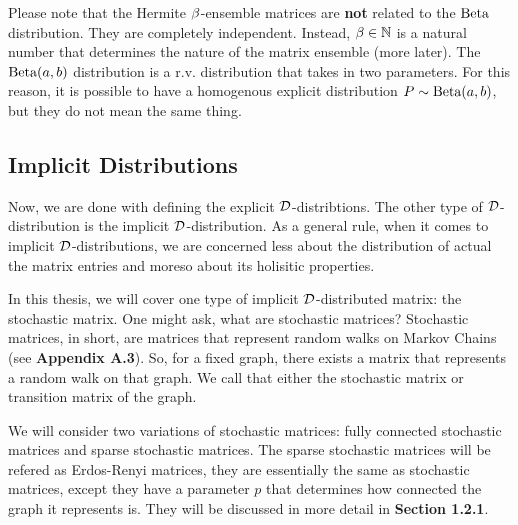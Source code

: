 \begin{warning}[$\b$-Notation]
Please note that the Hermite $\b$-ensemble matrices are \textbf{not} related to the $\text{Beta}$ distribution. They are completely independent.
Instead, $\beta \in \mathbb{N}$ is a natural number that determines the nature of the matrix ensemble (more later). The $\text{Beta}(a,b)$ distribution is a r.v. distribution that
takes in two parameters. For this reason, it is possible to have a homogenous explicit distribution $P \sim \text{Beta}(a,b)$, but they do not mean the same thing.
\end{warning}



\subsection{Implicit Distributions}

Now, we are done with defining the explicit $\mathcal{D}$-distribtions. The other type of $\mathcal{D}$-distribution is the implicit $\mathcal{D}$-distribution.
As a general rule, when it comes to implicit $\mathcal{D}$-distributions, we are concerned less about the distribution of actual the matrix entries and moreso about its holisitic properties.

In this thesis, we will cover one type of implicit $\mathcal{D}$-distributed matrix: the stochastic matrix. One might ask, what are stochastic matrices?
Stochastic matrices, in short, are matrices that represent random walks on Markov Chains (see \textbf{Appendix A.3}). So, for a fixed graph, there exists a matrix that represents a random walk on that graph.
We call that either the stochastic matrix or transition matrix of the graph.

We will consider two variations of stochastic matrices: fully connected stochastic matrices and sparse stochastic matrices.
The sparse stochastic matrices will be refered as Erdos-Renyi matrices, they are essentially the same as stochastic matrices, except they have a parameter $p$ that
determines how connected the graph it represents is. They will be discussed in more detail in \textbf{Section 1.2.1}.

